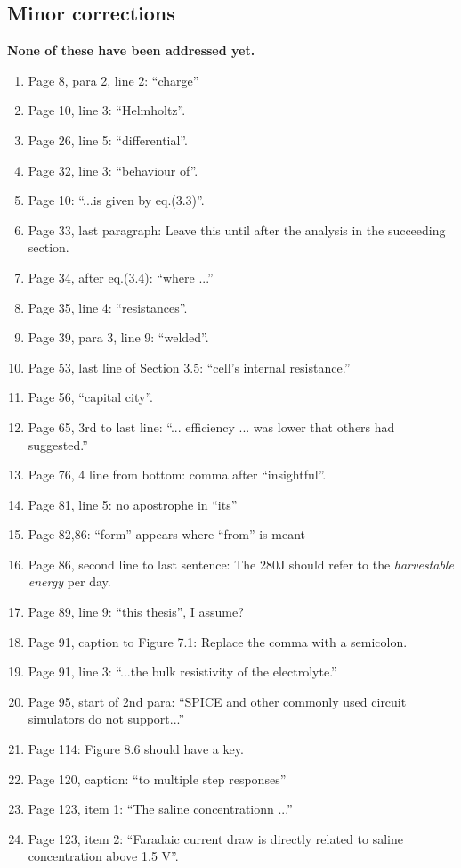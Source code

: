  \subsection*{Minor corrections}
  \textbf{\textcolor{OliveGreen}{
    None of these have been addressed yet.
  }}
    \begin{enumerate}
      \item Page 8, para 2, line 2: ``charge''
      \item Page 10, line 3: ``Helmholtz''.
      \item Page 26, line 5: ``differential''.
      \item Page 32, line 3: ``behaviour  of''.
      \item Page 10: ``...is given by eq.(3.3)''.
      \item Page 33, last paragraph: Leave this until after the analysis in the succeeding section.
      \item Page 34, after eq.(3.4): ``where ...''
      \item Page 35, line 4: ``resistances''.
      \item Page 39, para 3, line 9: ``welded''.
      \item Page 53, last line of Section 3.5: ``cell's internal resistance.''
      \item Page 56, ``capital city''.
      \item Page 65, 3rd to last line: ``... efficiency ... was lower that others had suggested.''
      \item Page 76, 4 line from bottom: comma after ``insightful''.
      \item Page 81, line 5: no apostrophe in ``its''
      \item Page 82,86: ``form'' appears where ``from'' is meant
      \item Page 86, second line to last sentence: The 280J should refer to the \emph{harvestable energy} per day.
      \item Page 89, line 9: ``this thesis'', I assume?
      \item Page 91, caption to Figure 7.1: Replace the comma with a semicolon.
      \item Page 91, line 3: ``...the bulk resistivity of the electrolyte.''
      \item Page 95, start of 2nd para: ``SPICE and other commonly used circuit simulators do not support...''
      \item Page 114: Figure 8.6 should have a key.
      \item Page 120, caption: ``to multiple step responses''
      \item Page 123, item 1: ``The saline concentrationn ...''
      \item Page 123, item 2: ``Faradaic current draw is directly related to saline concentration above 1.5 V''.
    \end{enumerate}